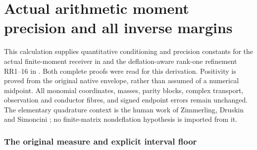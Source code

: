 

\clearpage\begingroup
\part*{Actual arithmetic moment precision and all inverse margins}
\newtheorem{mprectheorem}{Theorem}
\newtheorem{mpreclemma}[mprectheorem]{Lemma}
\newtheorem{mprecproposition}[mprectheorem]{Proposition}
\newcommand{\mprecC}{\mathbb C}
\newcommand{\mprecR}{\mathbb R}
\newcommand{\mprectr}{\operatorname{tr}}
\newcommand{\mprecdiag}{\operatorname{diag}}
\newcommand{\mprecnorm}[1]{\left\lVert#1\right\rVert}


This calculation supplies quantitative conditioning and precision
constants for the actual finite-moment receiver in \cite{mprec:FM} and the
deflation-aware rank-one refinement RR1--16 in \cite{mprec:RR}. Both complete
proofs were read for this derivation. Positivity is proved from the
original native envelope, rather than assumed of a numerical midpoint.
All monomial coordinates, masses, parity blocks, complex transport,
observation and conductor fibres, and signed endpoint errors remain
unchanged. The elementary quadrature context is the human work of
Zimmerling, Druskin and Simoncini \cite{mprec:ZDS}; no finite-matrix
nondeflation hypothesis is imported from it.

\section{The original measure and explicit interval floor}

